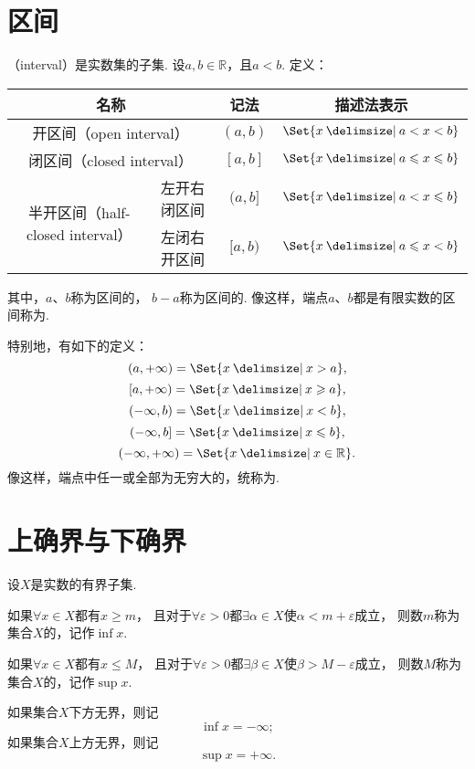 \section{区间}
\begin{definition}
（interval）是实数集的子集.
设\(a,b\in\mathbb{R}\)，且\(a<b\).
定义：
\begin{center}
\begin{tabular}{|*4{c|}} \hline
	\multicolumn{2}{|c|}{名称} & 记法 & 描述法表示 \\ \hline
	\multicolumn{2}{|c|}{开区间（open interval）} & \((a,b)\) & \(\Set{ x \given a < x < b }\) \\ \hline
	\multicolumn{2}{|c|}{闭区间（closed interval）} & \([a,b]\) & \(\Set{ x \given a \leqslant x \leqslant b }\) \\ \hline
	\multirow{2}{*}{半开区间（half-closed interval）} & 左开右闭区间 & \((a,b]\) & \(\Set{ x \given a < x \leqslant b }\) \\ \cline{2-4}
	& 左闭右开区间 & \([a,b)\) & \(\Set{ x \given a \leqslant x < b }\) \\ \hline
\end{tabular}
\end{center}
其中，\(a\)、\(b\)称为区间的，
\(b-a\)称为区间的.
像这样，端点\(a\)、\(b\)都是有限实数的区间称为.

特别地，有如下的定义：
\[
	(a,+\infty) = \Set{ x \given x > a },
\]\[
	[a,+\infty) = \Set{ x \given x \geqslant a },
\]\[
	(-\infty,b) = \Set{ x \given x < b },
\]\[
	(-\infty,b] = \Set{ x \given x \leqslant b },
\]\[
	(-\infty,+\infty) = \Set{ x \given x \in \mathbb{R} }.
\]
像这样，端点中任一或全部为无穷大的，统称为.
\end{definition}

\section{上确界与下确界}
\begin{definition}
设\(X\)是实数的有界子集.

如果\(\forall x \in X\)都有\(x \geqslant m\)，%
且对于\(\forall \varepsilon > 0\)都\(\exists \alpha \in X\)使\(\alpha < m + \varepsilon\)成立，%
则数\(m\)称为集合\(X\)的，记作\(\inf{x}\).

如果\(\forall x \in X\)都有\(x \leqslant M\)，%
且对于\(\forall \varepsilon > 0\)都\(\exists \beta \in X\)使\(\beta > M - \varepsilon\)成立，%
则数\(M\)称为集合\(X\)的，记作\(\sup{x}\).

如果集合\(X\)下方无界，则记\[
\inf{x} = -\infty;
\]如果集合\(X\)上方无界，则记\[
\sup{x} = +\infty.
\]
\end{definition}

